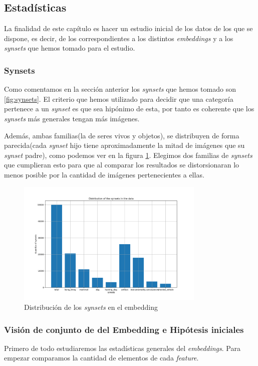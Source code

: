 \documentclass[12,twoside]{TFG-GM}
\theoremstyle{definition}
\theoremstyle{remark}
\begin{document}
\subsection{Estadísticas}\label{se:stats}
La finalidad de este capítulo es hacer un estudio inicial de los datos de los que se dispone, es decir, de los correspondientes a los distintos \textit{embeddings} y a los \textit{synsets} que hemos tomado para el estudio. 

\subsubsection{Synsets}

Como comentamos en la sección anterior los \textit{synsets} que hemos tomado son \ref{fig:synsets}. 
El criterio que hemos utilizado para decidir que una categoría pertenece a un \textit{synset} es que sea hipónimo de esta, por tanto es coherente que los \textit{synsets} más generales tengan más imágenes. 
 
Además, ambas familias(la de seres vivos y objetos), se distribuyen de forma parecida(cada \textit{synset} hijo tiene aproximadamente la mitad de imágenes que su \textit{synset} padre), como podemos ver en la figura \ref{fig:totalsynsets}. Elegimos dos familias de \textit{synsets} que cumplieran esto para que al comparar los resultados se distorsionaran lo menos posible por la cantidad de imágenes pertenecientes a ellas.

\begin{figure}[H] 
	\centering
	\includegraphics[width=0.8\textwidth] {Images/plots/25/distribution_of_synsets_bar.png}
	\caption{ Distribución de los \textit{synsets} en el embedding
	\label{fig:totalsynsets}}
\end{figure}


\subsubsection{Visión de conjunto de del Embedding e Hipótesis iniciales}
Primero de todo estudiaremos las estadísticas generales del \textit{embeddings}.
Para empezar comparamos la cantidad de elementos de cada \textit{feature}. 
\end{document}
